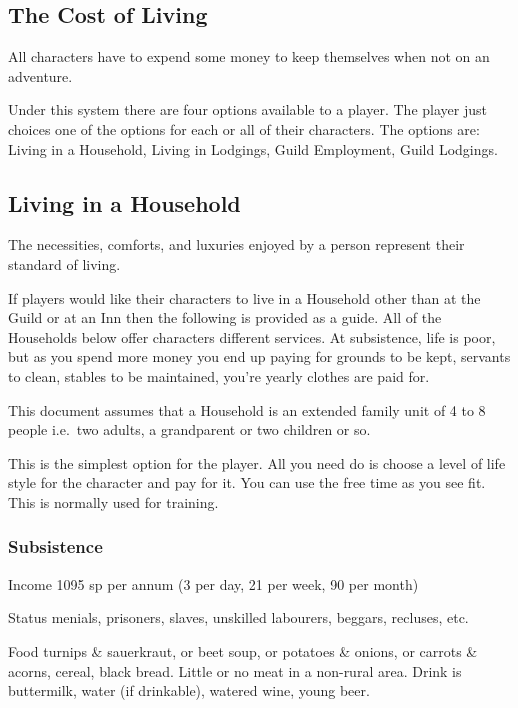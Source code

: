 \documentclass[twoside,a4paper]{article}
\begin{document}
\begin{multicols}{2}
\section{The Cost of Living}
\label{costliving}

All characters have to expend some money to keep themselves when not
on an adventure.

Under this system there are four options available to a player. The
player just choices one of the options for each or all of their
characters.  The options are: Living in a Household, Living in
Lodgings, Guild Employment, Guild Lodgings.

\subsection{Living in a Household}

The necessities, comforts, and luxuries enjoyed by a person represent
their standard of living.

If players would like their characters to live in a Household other
than at the Guild or at an Inn then the following is provided as a
guide. All of the Households below offer characters different
services.  At subsistence, life is poor, but as you spend more money
you end up paying for grounds to be kept, servants to clean, stables
to be maintained, you're yearly clothes are paid for.

This document assumes that a Household is an extended family unit of 4
to 8 people i.e.\ two adults, a grandparent or two children or so.

This is the simplest option for the player. All you need do is choose
a level of life style for the character and pay for it. You can use
the free time as you see fit. This is normally used for training.


\subsubsection{Subsistence}

\begin{idesc}
\item[Income] 1095 sp per annum (3 per day, 21 per week, 90 per month)

\item[Status] menials, prisoners, slaves, unskilled labourers,
beggars, recluses, etc.

\item[Food] turnips \& sauerkraut, or beet soup, or potatoes \&
onions, or carrots \& acorns, cereal, black bread. Little or no meat
in a non-rural area.  Drink is buttermilk, water (if drinkable),
watered wine, young beer.


\end{idesc}
\end{multicols}
\end{document}
